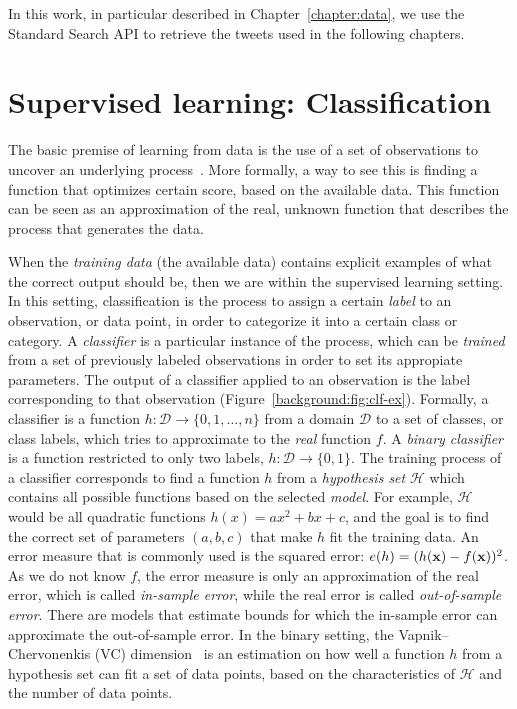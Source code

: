 In this work, in particular described in Chapter~\ref{chapter:data}, we use the
Standard Search API to retrieve the tweets used in the following chapters.



\section{Supervised learning: Classification}

The basic premise of learning from data is the use of a set of observations to
uncover an underlying process~\cite{Abu-Mostafa:2012:LD:2207825}. 
%
More formally, a way to see this is finding a function that optimizes certain
score, based on the available data. 
%
This function can be seen as an approximation of the real, unknown function
that describes the process that generates the data.


When the {\em training data} (the available data) contains explicit examples of
what the correct output should be, then we are within the supervised learning
setting.
%
In this setting, classification is the process to assign a certain {\em label}
to an observation, or data point, in order to categorize it into a certain class
or category.
%
A {\em classifier} is a particular instance of the process, which can be {\em
trained} from a set of previously labeled observations in order to set its
appropiate parameters.
%
The output of a classifier applied to an observation is the label corresponding
to that observation (Figure~\ref{background:fig:clf-ex}).
%
Formally, a classifier is a function $h: \mathcal{D} \rightarrow \{0, 1, \ldots,
n\}$ from a domain $\mathcal{D}$ to a set of classes, or class labels, which
tries to approximate to the {\em real} function $f$.
%
A {\em binary classifier} is a function restricted to only two labels, $h:
\mathcal{D} \rightarrow \{0, 1\}$.
%
The training process of a classifier corresponds to find a function $h$ from a
{\em hypothesis set} $\mathcal{H}$ which contains all possible functions based
on the selected {\em model}.
%
For example, $\mathcal{H}$ would be all quadratic functions $h(x) = ax^2 + bx +
c$, and the goal is to find the correct set of parameters $(a, b, c)$ that make
$h$ fit the training data.
%
An error measure that is commonly used is the squared error: $e(h) =
(h(\boldsymbol{\mathbf{x}}) - f(\boldsymbol{\mathbf{x}}))^2$.
%
As we do not know $f$, the error measure is only an approximation of the real
error, which is called {\em in-sample error}, while the real error is called
{\em out-of-sample error}.
% 
There are models that estimate bounds for which the in-sample error can
approximate the out-of-sample error.
%
In the binary setting, the Vapnik–Chervonenkis (VC) dimension~\cite{Vapnik2015}
is an estimation on how well a function $h$ from a hypothesis set can fit a set
of data points, based on the characteristics of $\mathcal{H}$ and the number of
data points.

